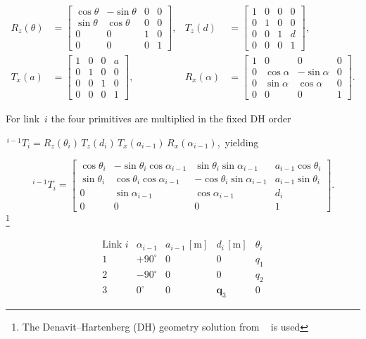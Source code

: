\documentclass[12pt,a4paper]{article}
\begin{document}
\begin{align}
R_{z}(\theta) &=
\begin{bmatrix}
\cos\theta & -\sin\theta & 0 & 0\\
\sin\theta &  \cos\theta & 0 & 0\\
0          &  0          & 1 & 0\\
0&0&0&1
\end{bmatrix}, &
T_{z}(d) &=
\begin{bmatrix}
1&0&0&0\\
0&1&0&0\\
0&0&1&d\\
0&0&0&1
\end{bmatrix}, \\
T_{x}(a) &=
\begin{bmatrix}
1&0&0&a\\
0&1&0&0\\
0&0&1&0\\
0&0&0&1
\end{bmatrix}, &
R_{x}(\alpha) &=
\begin{bmatrix}
1 & 0 & 0 & 0\\
0 & \cos\alpha & -\sin\alpha & 0\\
0 & \sin\alpha &  \cos\alpha & 0\\
0&0&0&1
\end{bmatrix}.
\end{align}


For link~$i$ the four primitives are multiplied in the fixed DH order 
 
\(
{}^{\,i-1}\!T_i = R_{z}(\theta_i)\,T_{z}(d_i)\,T_{x}(a_{i-1})\,R_{x}(\alpha_{i-1}),
\)
yielding

\[
{}^{\,i-1}\!T_i =
\begin{bmatrix}
\cos\theta_i & -\sin\theta_i\cos\alpha_{i-1} &  \sin\theta_i\sin\alpha_{i-1} & a_{i-1}\cos\theta_i\\
\sin\theta_i &  \cos\theta_i\cos\alpha_{i-1} & -\cos\theta_i\sin\alpha_{i-1} & a_{i-1}\sin\theta_i\\
0            &  \sin\alpha_{i-1}             &  \cos\alpha_{i-1}             & d_i\\
0&0&0&1
\end{bmatrix}.
\]
\footnote{The Denavit–Hartenberg (DH) geometry solution from ~\cite{Spong2006} is used}

\[
\begin{array}{c|c|c|c|c}
\text{Link }i & \alpha_{i-1} & a_{i-1}\,[\mathrm m] & d_i\,[\mathrm m] & \theta_i \\ \hline
1 & +90^{\circ} & 0 & 0 & q_1 \\
2 & -90^{\circ} & 0 & 0 & q_2 \\
3 & 0^{\circ}   & 0 & \mathbf q_3 & 0
\end{array}
\]
\end{document}
